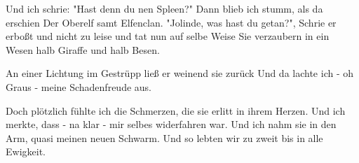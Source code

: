\begin{guitar}
	Und ich schrie: "Hast denn du nen Spleen?" Dann blieb ich stumm, als da erschien
	Der Oberelf samt Elfenclan. "Jolinde, was hast du getan?",
	Schrie er erboßt und nicht zu leise und tat nun auf selbe Weise
	Sie verzaubern in ein Wesen halb Giraffe und halb Besen.
	
	\begin{highlightbar}
		 
	\end{highlightbar}
	
	\songsection{Strophe 5}
	An einer Lichtung im Gestrüpp ließ er weinend sie zurück
	Und da lachte ich - oh Graus - meine Schadenfreude aus.
	
	Doch plötzlich fühlte ich die Schmerzen, die sie erlitt in ihrem Herzen.
	Und ich merkte, dass - na klar - mir selbes widerfahren war.
	Und ich nahm sie in den Arm, quasi meinen neuen Schwarm.
	Und so lebten wir zu zweit bis in alle Ewigkeit.
	
	\begin{highlightbar}
		  \optionalChord{(x2)}
	\end{highlightbar}
	
\end{guitar}

